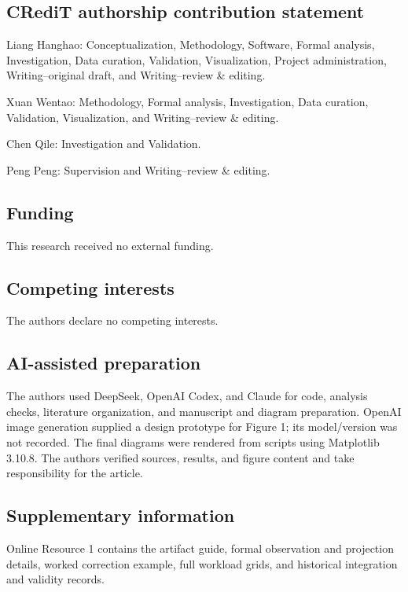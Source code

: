 \subsection*{CRediT authorship contribution statement}

Liang Hanghao: Conceptualization, Methodology, Software, Formal analysis, Investigation, Data curation, Validation, Visualization, Project administration, Writing--original draft, and Writing--review \& editing.

Xuan Wentao: Methodology, Formal analysis, Investigation, Data curation, Validation, Visualization, and Writing--review \& editing.

Chen Qile: Investigation and Validation.

Peng Peng: Supervision and Writing--review \& editing.

\subsection*{Funding}

This research received no external funding.

\subsection*{Competing interests}

The authors declare no competing interests.

\subsection*{AI-assisted preparation}

The authors used DeepSeek, OpenAI Codex, and Claude for code, analysis checks, literature organization, and manuscript and diagram preparation. OpenAI image generation supplied a design prototype for Figure 1; its model/version was not recorded. The final diagrams were rendered from scripts using Matplotlib 3.10.8. The authors verified sources, results, and figure content and take responsibility for the article.

\subsection*{Supplementary information}

Online Resource 1 contains the artifact guide, formal observation and projection details, worked correction example, full workload grids, and historical integration and validity records.
